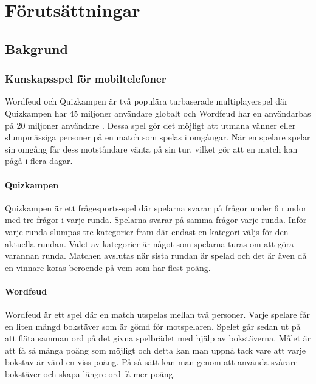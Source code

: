\documentclass[a4paper, 11pt]{article}
\begin{document}
\section{Förutsättningar}

\subsection{Bakgrund}

\subsubsection{Kunskapsspel för mobiltelefoner}
Wordfeud och Quizkampen är två populära turbaserade multiplayerspel där Quizkampen har 45 miljoner användare globalt \cite{quiz} och Wordfeud har en användarbas på 20 miljoner användare \cite{wordfeud}. Dessa spel gör det möjligt att utmana vänner eller slumpmässiga personer på en match som spelas i omgångar. När en spelare spelar sin omgång får dess motståndare vänta på sin tur, vilket gör att en match kan pågå i flera dagar.

\paragraph{Quizkampen \newline} 
Quizkampen \cite{aboutquiz} är ett frågesports-spel där spelarna svarar på frågor under 6 rundor med tre frågor i varje runda. Spelarna svarar på samma frågor varje runda.  Inför varje runda slumpas tre kategorier fram där endast en kategori väljs för den aktuella rundan. Valet av kategorier är något som spelarna turas om att göra varannan runda. Matchen avslutas när sista rundan är spelad och det är även då en vinnare koras beroende på vem som har flest poäng. 

\paragraph{Wordfeud \newline}
Wordfeud \cite{aboutwordfeud} är ett spel där en match utspelas mellan två personer. Varje spelare får en liten mängd bokstäver som är gömd för motspelaren. Spelet går sedan ut på att fläta samman ord på det givna spelbrädet med hjälp av bokstäverna. Målet är att få så många poäng som möjligt och detta kan man uppnå tack vare att varje bokstav är värd en viss poäng. På så sätt kan man genom att använda svårare bokstäver och skapa längre ord få mer poäng. 
\end{document}
